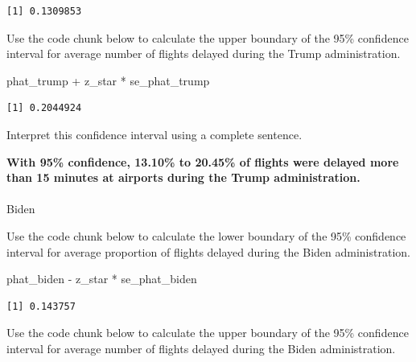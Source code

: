 \documentclass[
  letterpaper,
  DIV=11,
  numbers=noendperiod]{scrartcl}
\makeatletter
\let\oldparagraph\paragraph
\renewcommand{\paragraph}{
    \@ifstar
      \xxxParagraphStar
      \xxxParagraphNoStar
  }
\newcommand{\xxxParagraphStar}[1]{\oldparagraph*{#1}\mbox{}}
\newcommand{\xxxParagraphNoStar}[1]{\oldparagraph{#1}\mbox{}}
\newenvironment{Shaded}{\begin{snugshade}}{\end{snugshade}}
\newcommand{\NormalTok}[1]{\textcolor[rgb]{0.00,0.23,0.31}{#1}}
\newcommand{\SpecialCharTok}[1]{\textcolor[rgb]{0.37,0.37,0.37}{#1}}
\makeatother
\begin{document}
\begin{verbatim}
[1] 0.1309853
\end{verbatim}

Use the code chunk below to calculate the upper boundary of the 95\%
confidence interval for average number of flights delayed during the
Trump administration.

\begin{Shaded}
\begin{Highlighting}[]
\NormalTok{phat\_trump }\SpecialCharTok{+}\NormalTok{ z\_star }\SpecialCharTok{*}\NormalTok{ se\_phat\_trump}
\end{Highlighting}
\end{Shaded}

\begin{verbatim}
[1] 0.2044924
\end{verbatim}

Interpret this confidence interval using a complete sentence.

\begin{tcolorbox}[enhanced jigsaw, colback=white, breakable, arc=.35mm, left=2mm, colframe=quarto-callout-warning-color-frame, opacityback=0, rightrule=.15mm, toprule=.15mm, bottomrule=.15mm, leftrule=.75mm]

\textbf{With 95\% confidence, 13.10\% to 20.45\% of flights were delayed
more than 15 minutes at airports during the Trump administration.}

\end{tcolorbox}

\paragraph{Biden}\label{biden}

Use the code chunk below to calculate the lower boundary of the 95\%
confidence interval for average proportion of flights delayed during the
Biden administration.

\begin{Shaded}
\begin{Highlighting}[]
\NormalTok{phat\_biden }\SpecialCharTok{{-}}\NormalTok{ z\_star }\SpecialCharTok{*}\NormalTok{ se\_phat\_biden}
\end{Highlighting}
\end{Shaded}

\begin{verbatim}
[1] 0.143757
\end{verbatim}

Use the code chunk below to calculate the upper boundary of the 95\%
confidence interval for average number of flights delayed during the
Biden administration.
\end{document}
